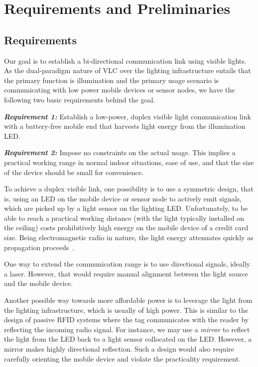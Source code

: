 \section{Requirements and Preliminaries}
\label{sec:background}

\subsection{Requirements}

Our goal is to establish a bi-directional communication link using visible lights. As the dual-paradigm nature of VLC over the lighting infrastructure entails that the primary function is illumination and the primary usage scenario is communicating with low power mobile devices or sensor nodes, we have the following two basic requirements behind the goal. 

\noindent\emph{\textbf{Requirement 1:}} Establish a low-power, duplex visible light communication link with a battery-free mobile end that harvests light energy from the illumination LED. 

\noindent\emph{\textbf{Requirement 2:}} Impose no constraints on the actual usage. This implies a practical working range in normal indoor situations, ease of use, and that the size of the device should be small for convenience.

To achieve a duplex visible link, one possibility is to use a symmetric design, that is, using an LED on the mobile device or sensor node to actively emit signals, which are picked up by a light sensor on the lighting LED. Unfortunately, to be able to reach a practical working distance (with the light typically installed on the ceiling) costs prohibitively high energy on the mobile device of a credit card size. Being electromagnetic radio in nature, the light energy attenuates quickly as propagation proceeds~\cite{lightwave}.

One way to extend the communication range is to use directional signals, ideally a laser. However, that would require manual alignment between the light source and the mobile device. 

Another possible way towards more affordable power is to leverage the light from the lighting infrastructure, which is usually of high power. This is similar to the design of passive RFID systems where the tag communicates with the reader by reflecting the incoming radio signal. For instance, we may use a \textit{mirror} to reflect the light from the LED back to a light sensor collocated on the LED. However, a mirror makes highly directional reflection. Such a design would also require carefully orienting the mobile device and violate the practicality requirement. 

